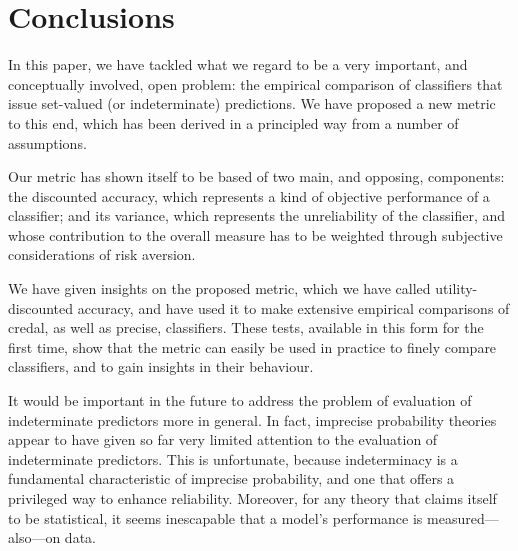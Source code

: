 \documentclass[a4paper,10pt,reqno]{amsart}
\theoremstyle{remark}
\begin{document}
\section{Conclusions}\label{sec:conc}
In this paper, we have tackled what we regard to be a very important, and conceptually involved, open problem: the empirical comparison of classifiers that issue set-valued (or indeterminate) predictions. We have proposed a new metric to this end, which has been derived in a principled way from a number of assumptions. 

Our metric has shown itself to be based of two main, and opposing, components: the discounted accuracy, which represents a kind of objective performance of a classifier; and its variance, which represents the unreliability of the classifier, and whose contribution to the overall measure has to be weighted through subjective considerations of risk aversion.

We have given insights on the proposed metric, which we have called utility-discounted accuracy, and have used it to make extensive empirical comparisons of credal, as well as precise, classifiers. These tests, available in this form for the first time, show that the metric can easily be used in practice to finely compare classifiers, and to gain insights in their behaviour. 

It would be important in the future to address the problem of evaluation of indeterminate predictors more in general. In fact, imprecise probability theories appear to have given so far very limited attention to the evaluation of indeterminate predictors. This is unfortunate, because indeterminacy is a fundamental characteristic of imprecise probability, and one that offers a privileged way to enhance reliability. Moreover, for any theory that claims itself to be statistical, it seems inescapable that a model's performance is measured---also---on data.
\end{document}
